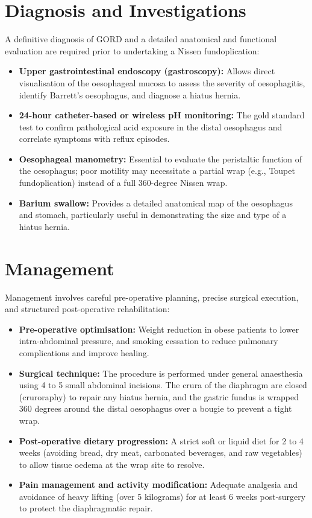 \section*{Diagnosis and Investigations}
A definitive diagnosis of GORD and a detailed anatomical and functional evaluation are required prior to undertaking a Nissen fundoplication:
\begin{itemize}
    \item \textbf{Upper gastrointestinal endoscopy (gastroscopy):} Allows direct visualisation of the oesophageal mucosa to assess the severity of oesophagitis, identify Barrett's oesophagus, and diagnose a hiatus hernia.
    \item \textbf{24-hour catheter-based or wireless pH monitoring:} The gold standard test to confirm pathological acid exposure in the distal oesophagus and correlate symptoms with reflux episodes.
    \item \textbf{Oesophageal manometry:} Essential to evaluate the peristaltic function of the oesophagus; poor motility may necessitate a partial wrap (e.g., Toupet fundoplication) instead of a full 360-degree Nissen wrap.
    \item \textbf{Barium swallow:} Provides a detailed anatomical map of the oesophagus and stomach, particularly useful in demonstrating the size and type of a hiatus hernia.
\end{itemize}

\section*{Management}
Management involves careful pre-operative planning, precise surgical execution, and structured post-operative rehabilitation:
\begin{itemize}
    \item \textbf{Pre-operative optimisation:} Weight reduction in obese patients to lower intra-abdominal pressure, and smoking cessation to reduce pulmonary complications and improve healing.
    \item \textbf{Surgical technique:} The procedure is performed under general anaesthesia using 4 to 5 small abdominal incisions. The crura of the diaphragm are closed (cruroraphy) to repair any hiatus hernia, and the gastric fundus is wrapped 360 degrees around the distal oesophagus over a bougie to prevent a tight wrap.
    \item \textbf{Post-operative dietary progression:} A strict soft or liquid diet for 2 to 4 weeks (avoiding bread, dry meat, carbonated beverages, and raw vegetables) to allow tissue oedema at the wrap site to resolve.
    \item \textbf{Pain management and activity modification:} Adequate analgesia and avoidance of heavy lifting (over 5 kilograms) for at least 6 weeks post-surgery to protect the diaphragmatic repair.
\end{itemize}

